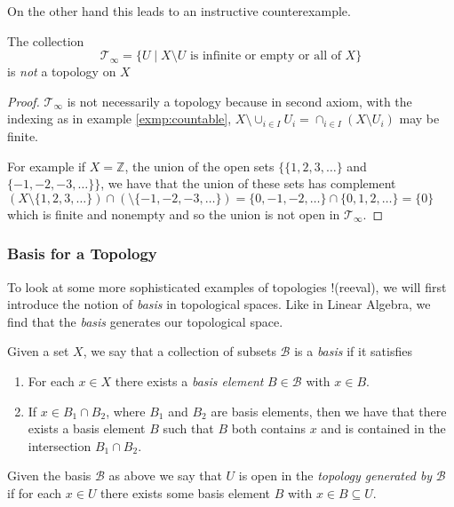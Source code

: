 On the other hand this leads to an instructive counterexample.

\begin{exmp}
  The collection
  \[
    \mathscr{T}_\infty = \{U \mid X \setminus U \text{ is infinite or
      empty or all of } X \}
  \]
  is \emph{not} a topology on $X$
\end{exmp}

\begin{proof}
  $\mathscr{T}_\infty$ is not necessarily a topology because in second
axiom, with the indexing as in example \ref{exmp:countable}, $X
\setminus \cup_{i \in I} U_i = \cap_{i \in I} (X \setminus U_i)$ may
be finite.

  For example if $X = \mathbb{Z}$, the union of the open sets $\{ \{1,
2, 3, \dots \}$ and $\{-1, -2, -3, \dots \} \}$, we have that the
union of these sets has complement $(X \setminus \{1, 2, 3, \dots \})
\cap (\setminus \{-1, -2, -3, \dots \}) = \{0, -1, -2, \dots \} \cap
\{0, 1, 2, \dots \} = \{ 0 \}$ which is finite and nonempty and so the
union is not open in $\mathscr{T}_\infty$.
\end{proof}


\subsubsection{Basis for a Topology}
\label{sec:prelims:topospace:basis}

To look at some more sophisticated examples of topologies !(reeval), we will
first introduce the notion of \emph{basis} in topological spaces. Like
in Linear Algebra, we find that the \emph{basis}  generates our
topological space. 

\begin{defn}
  Given a set $X$, we say that a collection of subsets $\mathscr{B}$
  is a \emph{basis} if it satisfies
  \begin{enumerate}
  \item For each $x \in X$ there exists a \emph{basis element} $B \in
    \mathscr{B}$ with $x \in B$.
  \item If $x \in B_1 \cap B_2$, where $B_1$ and $B_2$ are basis
    elements, then we have that there exists a basis element $B$ such
    that $B$ both contains $x$ and is contained in the intersection
    $B_1 \cap B_2$.
  \end{enumerate}
  Given the basis $\mathscr{B}$ as above we say that $U$ is open in
  the \emph{topology generated by} $\mathscr{B}$ if for each $x \in U$
  there exists some basis element $B$ with $x \in B \subseteq U$.
\end{defn}

